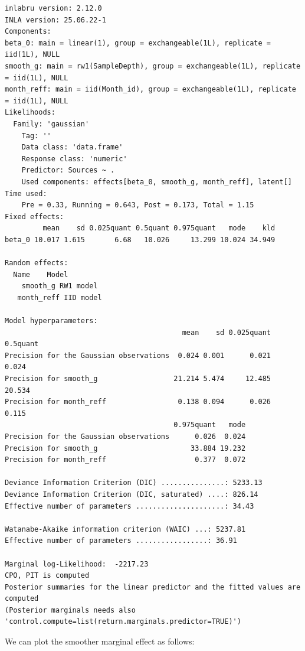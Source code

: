 \documentclass[
  letterpaper,
  DIV=11,
  numbers=noendperiod]{scrartcl}
\newenvironment{Shaded}{\begin{snugshade}}{\end{snugshade}}
\newcommand{\AttributeTok}[1]{\textcolor[rgb]{0.40,0.45,0.13}{#1}}
\newcommand{\FloatTok}[1]{\textcolor[rgb]{0.68,0.00,0.00}{#1}}
\newcommand{\FunctionTok}[1]{\textcolor[rgb]{0.28,0.35,0.67}{#1}}
\newcommand{\NormalTok}[1]{\textcolor[rgb]{0.00,0.23,0.31}{#1}}
\newcommand{\SpecialCharTok}[1]{\textcolor[rgb]{0.37,0.37,0.37}{#1}}
\newcommand{\StringTok}[1]{\textcolor[rgb]{0.13,0.47,0.30}{#1}}
\begin{document}
\begin{verbatim}
inlabru version: 2.12.0
INLA version: 25.06.22-1
Components:
beta_0: main = linear(1), group = exchangeable(1L), replicate = iid(1L), NULL
smooth_g: main = rw1(SampleDepth), group = exchangeable(1L), replicate = iid(1L), NULL
month_reff: main = iid(Month_id), group = exchangeable(1L), replicate = iid(1L), NULL
Likelihoods:
  Family: 'gaussian'
    Tag: ''
    Data class: 'data.frame'
    Response class: 'numeric'
    Predictor: Sources ~ .
    Used components: effects[beta_0, smooth_g, month_reff], latent[]
Time used:
    Pre = 0.33, Running = 0.643, Post = 0.173, Total = 1.15 
Fixed effects:
         mean    sd 0.025quant 0.5quant 0.975quant   mode    kld
beta_0 10.017 1.615       6.68   10.026     13.299 10.024 34.949

Random effects:
  Name    Model
    smooth_g RW1 model
   month_reff IID model

Model hyperparameters:
                                          mean    sd 0.025quant 0.5quant
Precision for the Gaussian observations  0.024 0.001      0.021    0.024
Precision for smooth_g                  21.214 5.474     12.485   20.534
Precision for month_reff                 0.138 0.094      0.026    0.115
                                        0.975quant   mode
Precision for the Gaussian observations      0.026  0.024
Precision for smooth_g                      33.884 19.232
Precision for month_reff                     0.377  0.072

Deviance Information Criterion (DIC) ...............: 5233.13
Deviance Information Criterion (DIC, saturated) ....: 826.14
Effective number of parameters .....................: 34.43

Watanabe-Akaike information criterion (WAIC) ...: 5237.81
Effective number of parameters .................: 36.91

Marginal log-Likelihood:  -2217.23 
CPO, PIT is computed 
Posterior summaries for the linear predictor and the fitted values are computed
(Posterior marginals needs also 'control.compute=list(return.marginals.predictor=TRUE)')
\end{verbatim}

We can plot the smoother marginal effect as follows:

\begin{Shaded}
\end{Shaded}
\end{document}
